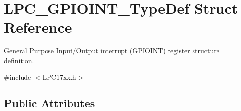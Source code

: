 \hypertarget{struct_l_p_c___g_p_i_o_i_n_t___type_def}{\section{\-L\-P\-C\-\_\-\-G\-P\-I\-O\-I\-N\-T\-\_\-\-Type\-Def \-Struct \-Reference}
\label{struct_l_p_c___g_p_i_o_i_n_t___type_def}
}


\-General \-Purpose \-Input/\-Output interrupt (\-G\-P\-I\-O\-I\-N\-T) register structure definition.  




{\ttfamily \#include $<$\-L\-P\-C17xx.\-h$>$}

\subsection*{\-Public \-Attributes}

